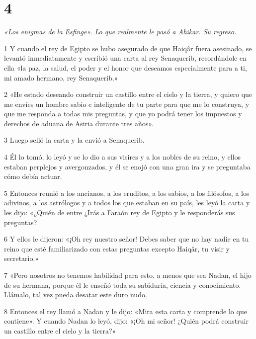 \chapter{4}

\par \textit{«Los enigmas de la Esfinge». Lo que realmente le pasó a Ahikar. Su regreso.}

\par 1 Y cuando el rey de Egipto se hubo asegurado de que Haiqâr fuera asesinado, se levantó inmediatamente y escribió una carta al rey Senaquerib, recordándole en ella «la paz, la salud, el poder y el honor que deseamos especialmente para a ti, mi amado hermano, rey Senaquerib.»

\par 2 «He estado deseando construir un castillo entre el cielo y la tierra, y quiero que me envíes un hombre sabio e inteligente de tu parte para que me lo construya, y que me responda a todas mis preguntas, y que yo podrá tener los impuestos y derechos de aduana de Asiria durante tres años».

\par 3 Luego selló la carta y la envió a Senaquerib.

\par 4 Él lo tomó, lo leyó y se lo dio a sus visires y a los nobles de su reino, y ellos estaban perplejos y avergonzados, y él se enojó con una gran ira y se preguntaba cómo debía actuar.

\par 5 Entonces reunió a los ancianos, a los eruditos, a los sabios, a los filósofos, a los adivinos, a los astrólogos y a todos los que estaban en su país, les leyó la carta y les dijo: «¿Quién de entre ¿Irás a Faraón rey de Egipto y le responderás sus preguntas?

\par 6 Y ellos le dijeron: «¡Oh rey nuestro señor! Debes saber que no hay nadie en tu reino que esté familiarizado con estas preguntas excepto Haiqâr, tu visir y secretario.»

\par 7 «Pero nosotros no tenemos habilidad para esto, a menos que sea Nadan, el hijo de su hermana, porque él le enseñó toda su sabiduría, ciencia y conocimiento. Llámalo, tal vez pueda desatar este duro nudo.

\par 8 Entonces el rey llamó a Nadan y le dijo: «Mira esta carta y comprende lo que contiene». Y cuando Nadan lo leyó, dijo: «¡Oh mi señor! ¿Quién podrá construir un castillo entre el cielo y la tierra?»

